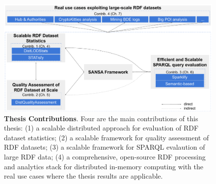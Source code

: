 \begin{figure}
\centering
\includegraphics[width=1.0\columnwidth]{images/1_introduction/thesis-contributions.pdf}
\caption{\textbf{Thesis Contributions}. Four are the main contributions of this thesis: (1) a scalable distributed approach for evaluation of RDF dataset statistics; (2) a scalable framework for quality assessment of RDF datasets; (3) a scalable framework for SPARQL evalaution of large RDF data; (4) a comprehensive, open-source RDF processing and analytics stack for distributed in-memory computing with the real use cases where the thesis results are applicable.}
\label{fig:thesis-contributions}
\end{figure}

